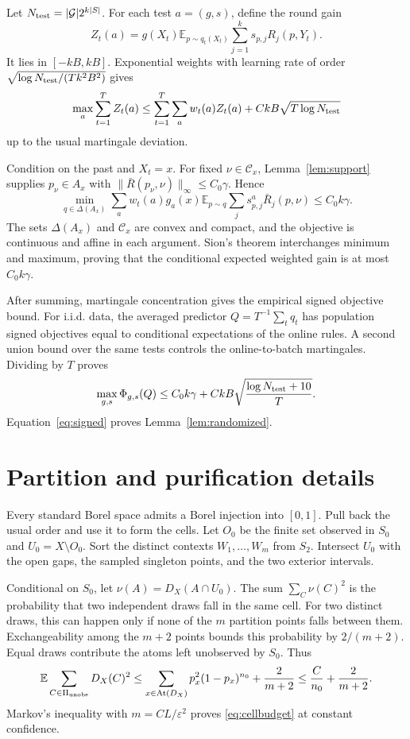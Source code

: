 \documentclass{article}
\theoremstyle{definition}
\theoremstyle{remark}
\newcommand{\E}{\mathbb E}
\newcommand{\1}{\mathbf 1}
\newcommand{\cG}{\mathcal G}
\newcommand{\cC}{\mathcal C}
\newcommand{\simplex}{\Delta}
\newcommand{\At}{\operatorname{At}}
\begin{document}
Let $N_{\rm test}=|\cG|2^{k|S|}$. For each test $a=(g,s)$, define the round gain
\[
Z_t(a)=g(X_t)\E_{p\sim q_t(X_t)}\sum_{j=1}^ks_{p,j}R_j(p,Y_t).
\]
It lies in $[-kB,kB]$. Exponential weights with learning rate of order $\sqrt{\log N_{\rm test}/(Tk^2B^2)}$ gives
\[
\max_a\sum_{t=1}^TZ_t(a)
\le \sum_{t=1}^T\sum_aw_t(a)Z_t(a)+CkB\sqrt{T\log N_{\rm test}}
\]
up to the usual martingale deviation.

Condition on the past and $X_t=x$. For fixed $\nu\in\cC_x$, Lemma~\ref{lem:support} supplies $p_\nu\in A_x$ with $\|\bar R(p_\nu,\nu)\|_\infty\le C_0\gamma$. Hence
\[
\min_{q\in\simplex(A_x)}\sum_aw_t(a)g_a(x)\E_{p\sim q}\sum_js^a_{p,j}\bar R_j(p,\nu)
\le C_0k\gamma.
\]
The sets $\simplex(A_x)$ and $\cC_x$ are convex and compact, and the objective is continuous and affine in each argument. Sion's theorem interchanges minimum and maximum, proving that the conditional expected weighted gain is at most $C_0k\gamma$.

After summing, martingale concentration gives the empirical signed objective bound. For i.i.d. data, the averaged predictor $Q=T^{-1}\sum_tq_t$ has population signed objectives equal to conditional expectations of the online rules. A second union bound over the same tests controls the online-to-batch martingales. Dividing by $T$ proves
\[
\max_{g,s}\Phi_{g,s}(Q)
\le C_0k\gamma+CkB\sqrt{\frac{\log N_{\rm test}+10}{T}}.
\]
Equation~\eqref{eq:signed} proves Lemma~\ref{lem:randomized}.

\section{Partition and purification details}\label{app:purification}

Every standard Borel space admits a Borel injection into $[0,1]$. Pull back the usual order and use it to form the cells. Let $O_0$ be the finite set observed in $S_0$ and $U_0=X\setminus O_0$. Sort the distinct contexts $W_1,\ldots,W_m$ from $S_2$. Intersect $U_0$ with the open gaps, the sampled singleton points, and the two exterior intervals.

Conditional on $S_0$, let $\nu(A)=D_X(A\cap U_0)$. The sum $\sum_C\nu(C)^2$ is the probability that two independent draws fall in the same cell. For two distinct draws, this can happen only if none of the $m$ partition points falls between them. Exchangeability among the $m+2$ points bounds this probability by $2/(m+2)$. Equal draws contribute the atoms left unobserved by $S_0$. Thus
\[
\E\sum_{C\in\Pi_{\rm unobs}}D_X(C)^2
\le \sum_{x\in\At(D_X)}p_x^2(1-p_x)^{n_0}+\frac2{m+2}
\le \frac{C}{n_0}+\frac2{m+2}.
\]
Markov's inequality with $m=CL/\varepsilon^2$ proves \eqref{eq:cellbudget} at constant confidence.
\end{document}
